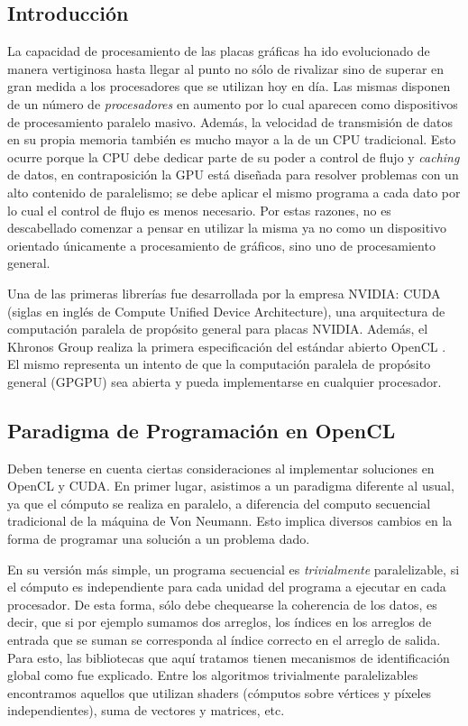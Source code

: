 \subsection{Introducci\'on}
La capacidad de procesamiento de las placas gr\'aficas ha ido evolucionado de manera vertiginosa hasta llegar al punto no s\'olo de rivalizar sino de superar en gran medida a los procesadores que se utilizan hoy en d\'ia.
Las mismas disponen de un n\'umero de {\em procesadores} en aumento por lo cual aparecen como dispositivos de procesamiento paralelo masivo.
Adem\'as, la velocidad de transmisi\'on de datos en su propia memoria tambi\'en es mucho mayor a la de un CPU tradicional.
Esto ocurre porque la CPU debe dedicar parte de su poder a control de flujo y {\em caching} de datos, en contraposici\'on la GPU est\'a dise\~nada para resolver problemas con un alto contenido de paralelismo; se debe aplicar el mismo programa a cada dato por lo cual el control de flujo es menos necesario.
Por estas razones, no es descabellado comenzar a pensar en utilizar la misma ya no como un dispositivo orientado \'unicamente a procesamiento de gr\'aficos, sino uno de procesamiento general.


Una de las primeras librerías fue desarrollada por la empresa NVIDIA: CUDA (siglas en ingl\'es de Compute Unified Device Architecture), una arquitectura de computaci\'on paralela de prop\'osito general para placas NVIDIA.
Además, el Khronos Group realiza la primera especificación del estándar abierto OpenCL \cite{Stone2010}.
El mismo representa un intento de que la computación paralela de propósito general (GPGPU) sea abierta y pueda implementarse en cualquier procesador.

\subsection{Paradigma de Programación en OpenCL}
Deben tenerse en cuenta ciertas consideraciones al implementar soluciones en OpenCL y CUDA.
En primer lugar, asistimos a un paradigma diferente al usual, ya que el cómputo se realiza en paralelo, a diferencia del computo secuencial tradicional de la máquina de Von Neumann.
Esto implica diversos cambios en la forma de programar una solución a un problema dado.

En su versión más simple, un programa secuencial es {\em trivialmente} paralelizable, si el cómputo es independiente para cada unidad del programa a ejecutar en cada procesador.
De esta forma, sólo debe chequearse la coherencia de los datos, es decir, que si por ejemplo sumamos dos arreglos, los índices en los arreglos de entrada que se suman se corresponda al índice correcto en el arreglo de salida.
Para esto, las bibliotecas que aquí tratamos tienen mecanismos de identificación global como fue explicado.
Entre los algoritmos trivialmente paralelizables encontramos aquellos que utilizan shaders (cómputos sobre vértices y píxeles independientes), suma de vectores y matrices, etc.

